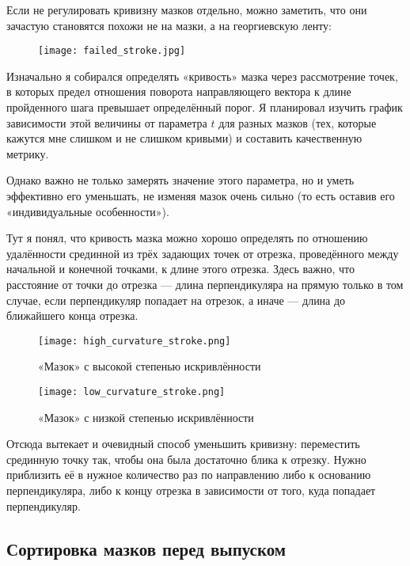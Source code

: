 Если не регулировать кривизну мазков отдельно, можно заметить,
что они зачастую становятся похожи не на мазки, а на георгиевскую ленту:

\begin{figure}[h!]
    \centering
    \texttt{[image: failed\_stroke.jpg]}
    \label{fig:failed_stroke}
\end{figure}

Изначально я собирался определять «кривость» мазка через рассмотрение точек,
в которых предел отношения поворота направляющего вектора к длине пройденного шага превышает определённый порог.
Я планировал изучить график зависимости этой величины от параметра $t$ для разных мазков
(тех, которые кажутся мне слишком и не слишком кривыми) и составить качественную метрику.

Однако важно не только замерять значение этого параметра, но и уметь эффективно его уменьшать,
не изменяя мазок очень сильно (то есть оставив его «индивидуальные особенности»).

Тут я понял, что кривость мазка можно хорошо определять по отношению удалённости срединной из трёх задающих точек от отрезка,
проведённого между начальной и конечной точками, к длине этого отрезка.
Здесь важно, что расстояние от точки до отрезка — длина перпендикуляра на прямую только в том случае,
если перпендикуляр попадает на отрезок, а иначе — длина до ближайшего конца отрезка.

\begin{figure}[h!]
    \centering
    \texttt{[image: high\_curvature\_stroke.png]}
    \caption{«Мазок» с высокой степенью искривлённости}
    \label{fig:high_curvature_stroke}
\end{figure}

\begin{figure}[h!]
    \centering
    \texttt{[image: low\_curvature\_stroke.png]}
    \caption{«Мазок» с низкой степенью искривлённости}
    \label{fig:low_curvature_stroke}
\end{figure}

Отсюда вытекает и очевидный способ уменьшить кривизну: переместить срединную точку так, чтобы она была достаточно блика к отрезку.
Нужно приблизить её в нужное количество раз по направлению либо к основанию перпендикуляра,
либо к концу отрезка в зависимости от того, куда попадает перпендикуляр.


\subsection{Сортировка мазков перед выпуском}\label{subsec:stroke_sorting}


